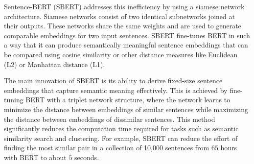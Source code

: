 Sentence-BERT (SBERT) addresses this inefficiency by using a siamese network architecture. 
Siamese networks consist of two identical subnetworks joined at their outputs. 
These networks share the same weights and are used to generate comparable embeddings for two input sentences. 
SBERT fine-tunes BERT in such a way that it can produce semantically meaningful 
sentence embeddings that can be compared using cosine similarity or other distance measures 
like Euclidean (L2) or Manhattan distance (L1).

The main innovation of SBERT is its ability to derive 
fixed-size sentence embeddings that capture semantic meaning effectively. 
This is achieved by fine-tuning BERT with a triplet network structure, 
where the network learns to minimize the distance between embeddings of similar 
sentences while maximizing the distance between embeddings of dissimilar sentences.
This method significantly reduces the computation time required for tasks such as 
semantic similarity search and clustering. For example, SBERT can reduce the effort 
of finding the most similar pair in a collection of 10,000 sentences from $65$ hours 
with BERT to about $5$ seconds.
